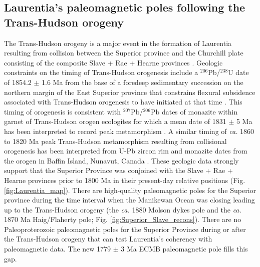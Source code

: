 \documentclass[draft]{agujournal2019}
\begin{document}
\subsection{Laurentia's paleomagnetic poles following the Trans-Hudson orogeny}

The Trans-Hudson orogeny is a major event in the formation of Laurentia resulting from collision between the Superior province and the Churchill plate consisting of the composite Slave + Rae + Hearne provinces \cite{Corrigan2009a, Weller2017a}. Geologic constraints on the timing of Trans-Hudson orogenesis include a $^{206}$Pb/$^{238}$U date of 1854.2 $\pm$ 1.6 Ma from the base of a foredeep sedimentary succession on the northern margin of the East Superior province that constrains flexural subsidence associated with Trans-Hudson orogenesis to have initiated at that time \cite{Hodgskiss2019a}. This timing of orogenesis is consistent with $^{207}$Pb/$^{206}$Pb dates of monazite within garnet of Trans-Hudson orogen ecologites for which a mean date of 1831 $\pm$ 5 Ma has been interpreted to record peak metamorphism \cite{Weller2017a}. A similar timing of \textit{ca.} 1860 to 1820 Ma peak Trans-Hudson metamorphism resulting from collisional orogenesis has been interpreted from U-Pb zircon rim and monazite dates from the orogen in Baffin Island, Nunavut, Canada \cite{Skipton2016a}. These geologic data strongly support that the Superior Province was conjoined with the Slave + Rae + Hearne provinces prior to 1800 Ma in their present-day relative positions (Fig. \ref{fig:Laurentia_map}). There are high-quality paleomagnetic poles for the Superior province during the time interval when the Manikewan Ocean was closing leading up to the Trans-Hudson orogeny (the \textit{ca.} 1880 Molson dykes pole and the \textit{ca.} 1870 Ma Haig/Flaherty pole; Fig. \ref{fig:Superior_Slave_recons}). There are no Paleoproterozoic paleomagnetic poles for the Superior Province during or after the Trans-Hudson orogeny that can test Laurentia's coherency with paleomagnetic data. The new 1779 $\pm$ 3 Ma ECMB paleomagnetic pole fills this gap.
\end{document}
